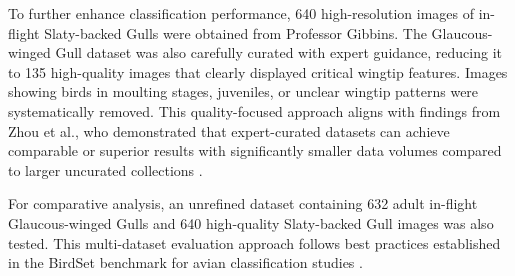 \documentclass[a4paper,12pt]{report}
\begin{document}
To further enhance classification performance, 640 high-resolution images of in-flight Slaty-backed Gulls were obtained from Professor Gibbins. The Glaucous-winged Gull dataset was also carefully curated with expert guidance, reducing it to 135 high-quality images that clearly displayed critical wingtip features. Images showing birds in moulting stages, juveniles, or unclear wingtip patterns were systematically removed. This quality-focused approach aligns with findings from Zhou et al., who demonstrated that expert-curated datasets can achieve comparable or superior results with significantly smaller data volumes compared to larger uncurated collections \citet{zhou2022}.

For comparative analysis, an unrefined dataset containing 632 adult in-flight Glaucous-winged Gulls and 640 high-quality Slaty-backed Gull images was also tested. This multi-dataset evaluation approach follows best practices established in the BirdSet benchmark for avian classification studies \citet{birdset2023}.








\end{document}
